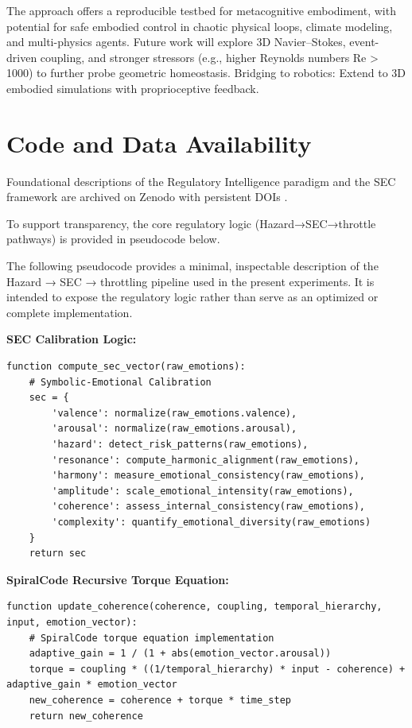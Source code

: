 \documentclass[12pt,a4paper]{article}
\begin{document}
The approach offers a reproducible testbed for metacognitive embodiment, with potential for safe embodied control in chaotic physical loops, climate modeling, and multi-physics agents. Future work will explore 3D Navier--Stokes, event-driven coupling, and stronger stressors (e.g., higher Reynolds numbers Re > 1000) to further probe geometric homeostasis. Bridging to robotics: Extend to 3D embodied simulations with proprioceptive feedback.

\section*{Code and Data Availability}

Foundational descriptions of the Regulatory Intelligence paradigm and the SEC framework are archived on Zenodo with persistent DOIs \cite{Cragin2026RI,Cragin2026SEC}.

To support transparency, the core regulatory logic (Hazard→SEC→throttle pathways) is provided in pseudocode below.

The following pseudocode provides a minimal, inspectable description of the Hazard → SEC → throttling pipeline used in the present experiments. It is intended to expose the regulatory logic rather than serve as an optimized or complete implementation.

\pagebreak

\textbf{SEC Calibration Logic:}

\begin{lstlisting}
function compute_sec_vector(raw_emotions):
    # Symbolic-Emotional Calibration
    sec = {
        'valence': normalize(raw_emotions.valence),
        'arousal': normalize(raw_emotions.arousal),
        'hazard': detect_risk_patterns(raw_emotions),
        'resonance': compute_harmonic_alignment(raw_emotions),
        'harmony': measure_emotional_consistency(raw_emotions),
        'amplitude': scale_emotional_intensity(raw_emotions),
        'coherence': assess_internal_consistency(raw_emotions),
        'complexity': quantify_emotional_diversity(raw_emotions)
    }
    return sec
\end{lstlisting}

\textbf{SpiralCode Recursive Torque Equation:}

\begin{lstlisting}
function update_coherence(coherence, coupling, temporal_hierarchy, input, emotion_vector):
    # SpiralCode torque equation implementation
    adaptive_gain = 1 / (1 + abs(emotion_vector.arousal))
    torque = coupling * ((1/temporal_hierarchy) * input - coherence) + adaptive_gain * emotion_vector
    new_coherence = coherence + torque * time_step
    return new_coherence
\end{lstlisting}
\end{document}
